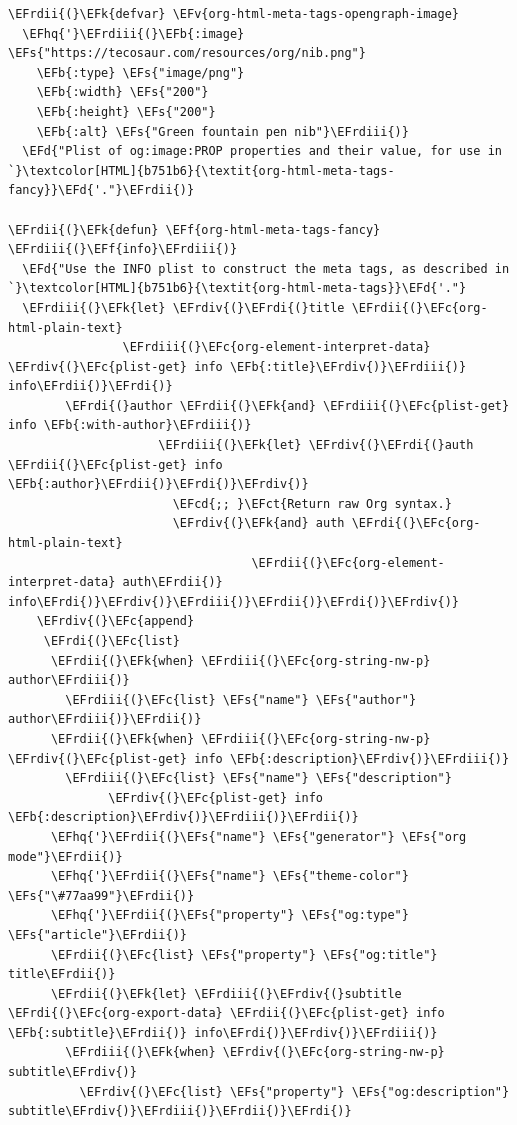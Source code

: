 \documentclass{scrartcl}
\newcommand{\EFk}[1]{\textcolor{EFk}{#1}} %
\newcommand{\EFd}[1]{\textcolor{EFd}{\textit{#1}}} %
\newcommand{\EFs}[1]{\textcolor{EFs}{#1}} %
\newcommand{\EFb}[1]{\textcolor{EFb}{#1}} %
\newcommand{\EFct}[1]{\textcolor{EFct}{#1}} %
\newcommand{\EFc}[1]{\textcolor{EFc}{#1}} %
\newcommand{\EFv}[1]{\textcolor{EFv}{#1}} %
\newcommand{\EFf}[1]{\textcolor{EFf}{#1}} %
\newcommand{\EFcd}[1]{\textcolor{EFcd}{#1}} %
\newcommand{\EFhq}[1]{\textcolor{EFhq}{#1}} %
\newcommand{\EFrdi}[1]{\textcolor{EFrdi}{#1}} %
\newcommand{\EFrdii}[1]{\textcolor{EFrdii}{#1}} %
\newcommand{\EFrdiii}[1]{\textcolor{EFrdiii}{#1}} %
\newcommand{\EFrdiv}[1]{\textcolor{EFrdiv}{#1}} %
\begin{document}
\begin{Code}
\begin{Verbatim}[]
 \EFrdii{(}\EFk{defvar} \EFv{org-html-meta-tags-opengraph-image}
  \EFhq{'}\EFrdiii{(}\EFb{:image} \EFs{"https://tecosaur.com/resources/org/nib.png"}
    \EFb{:type} \EFs{"image/png"}
    \EFb{:width} \EFs{"200"}
    \EFb{:height} \EFs{"200"}
    \EFb{:alt} \EFs{"Green fountain pen nib"}\EFrdiii{)}
  \EFd{"Plist of og:image:PROP properties and their value, for use in `}\textcolor[HTML]{b751b6}{\textit{org-html-meta-tags-fancy}}\EFd{'."}\EFrdii{)}

\EFrdii{(}\EFk{defun} \EFf{org-html-meta-tags-fancy} \EFrdiii{(}\EFf{info}\EFrdiii{)}
  \EFd{"Use the INFO plist to construct the meta tags, as described in `}\textcolor[HTML]{b751b6}{\textit{org-html-meta-tags}}\EFd{'."}
  \EFrdiii{(}\EFk{let} \EFrdiv{(}\EFrdi{(}title \EFrdii{(}\EFc{org-html-plain-text}
                \EFrdiii{(}\EFc{org-element-interpret-data} \EFrdiv{(}\EFc{plist-get} info \EFb{:title}\EFrdiv{)}\EFrdiii{)} info\EFrdii{)}\EFrdi{)}
        \EFrdi{(}author \EFrdii{(}\EFk{and} \EFrdiii{(}\EFc{plist-get} info \EFb{:with-author}\EFrdiii{)}
                     \EFrdiii{(}\EFk{let} \EFrdiv{(}\EFrdi{(}auth \EFrdii{(}\EFc{plist-get} info \EFb{:author}\EFrdii{)}\EFrdi{)}\EFrdiv{)}
                       \EFcd{;; }\EFct{Return raw Org syntax.}
                       \EFrdiv{(}\EFk{and} auth \EFrdi{(}\EFc{org-html-plain-text}
                                  \EFrdii{(}\EFc{org-element-interpret-data} auth\EFrdii{)} info\EFrdi{)}\EFrdiv{)}\EFrdiii{)}\EFrdii{)}\EFrdi{)}\EFrdiv{)}
    \EFrdiv{(}\EFc{append}
     \EFrdi{(}\EFc{list}
      \EFrdii{(}\EFk{when} \EFrdiii{(}\EFc{org-string-nw-p} author\EFrdiii{)}
        \EFrdiii{(}\EFc{list} \EFs{"name"} \EFs{"author"} author\EFrdiii{)}\EFrdii{)}
      \EFrdii{(}\EFk{when} \EFrdiii{(}\EFc{org-string-nw-p} \EFrdiv{(}\EFc{plist-get} info \EFb{:description}\EFrdiv{)}\EFrdiii{)}
        \EFrdiii{(}\EFc{list} \EFs{"name"} \EFs{"description"}
              \EFrdiv{(}\EFc{plist-get} info \EFb{:description}\EFrdiv{)}\EFrdiii{)}\EFrdii{)}
      \EFhq{'}\EFrdii{(}\EFs{"name"} \EFs{"generator"} \EFs{"org mode"}\EFrdii{)}
      \EFhq{'}\EFrdii{(}\EFs{"name"} \EFs{"theme-color"} \EFs{"\#77aa99"}\EFrdii{)}
      \EFhq{'}\EFrdii{(}\EFs{"property"} \EFs{"og:type"} \EFs{"article"}\EFrdii{)}
      \EFrdii{(}\EFc{list} \EFs{"property"} \EFs{"og:title"} title\EFrdii{)}
      \EFrdii{(}\EFk{let} \EFrdiii{(}\EFrdiv{(}subtitle \EFrdi{(}\EFc{org-export-data} \EFrdii{(}\EFc{plist-get} info \EFb{:subtitle}\EFrdii{)} info\EFrdi{)}\EFrdiv{)}\EFrdiii{)}
        \EFrdiii{(}\EFk{when} \EFrdiv{(}\EFc{org-string-nw-p} subtitle\EFrdiv{)}
          \EFrdiv{(}\EFc{list} \EFs{"property"} \EFs{"og:description"} subtitle\EFrdiv{)}\EFrdiii{)}\EFrdii{)}\EFrdi{)}

\end{Verbatim}
\end{Code}
\end{document}
